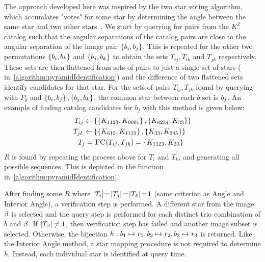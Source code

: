 The approach developed here was inspired by the two star voting algorithm, which accumlates "votes" for some star by
determining the angle between the same star and two other stars~\cite{tichy:preliminaryTestsCommericalImagers}.
We start by querying for pairs from the $K^2$ catalog such that the angular separations of the catalog pairs are
close to the angular separation of the image pair $\left\{ b_i, b_j \right\}$.
This is repeated for the other two permutations $\left\{ b_i, b_k \right\}$ and $\left\{  b_j, b_k  \right\}$ to obtain
the sets $T_{ij}, T_{ik}$ and $T_{jk}$ respectively.
These sets are then flattened from sets of pairs to just a single set of stars (
in~\autoref{algorithm:pyramidIdentification}) and the difference of two flattened sets identify candidates for that
star.
For the sets of pairs $T_{ij}, T_{jk}$ found by querying with $P_\theta$ and $\left\{ b_i, b_j \right\},
\left\{ b_j, b_k \right\}$, the common star between each $b$ set is $b_j$.
An example of finding catalog candidates for $b_j$ with this method is given below:
\begin{equation}
    \begin{aligned}
        T_{ij} \gets& \set{ \set{\vv{K_{1123}}, \vv{K_{9001}}}, \set{\vv{K_{8234}}, \vv{K_{33}}} } \\
        T_{jk} \gets& \set{ \set{\vv{K_{612}}, \vv{K_{1123}}}, \set{\vv{K_{33}}, \vv{K_{345}}} } \\
        T_j =& \  \Call{FC}{T_{ij}, T_{jk}} = \set{\vv{K_{1123}}, \vv{K_{33}}}
    \end{aligned}
\end{equation}
$R$ is found by repeating the process above for $T_i$ and $T_k$, and generating all possible sequences.
This is depicted in the  function in~\autoref{algorithm:pyramidIdentification}.

After finding some $R$ where $\left| T_i \right| \!=\! \left| T_j \right| \!=\! \left| T_k \right| \!=\! 1$ (same criterion as Angle and
Interior Angle), a verification step is performed.
A different star from the image $\beta$ is selected and the query step is performed for each distinct trio
combination of $b$ and $\beta$.
If $\left| T_\beta \right| \neq 1$, then verification step has failed and another image subset is selected.
Otherwise, the bijection $h : b_1 \mapsto r_1, b_2 \mapsto r_2, b_3 \mapsto r_3$ is
returned.
Like the Interior Angle method, a star mapping procedure is not required to determine $h$.
Instead, each individual star is identified at query time.

